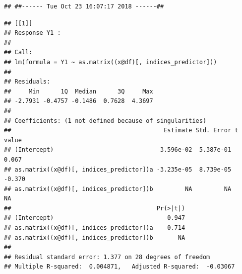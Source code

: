\documentclass{article}
\begin{document}
\begin{knitrout}
\color{fgcolor}\begin{kframe}
\begin{alltt}
\hlstd{()}
\end{alltt}
\begin{verbatim}
## ##------ Tue Oct 23 16:07:17 2018 ------##
\end{verbatim}
\begin{alltt}
 \hlkwb{<-} \hlstd{(}\hlstd{,}
                                \hlstd{=}\hlstd{,}
                                \hlstd{=}\hlstd{(}\hlstd{,} \hlopt{:}\hlstd{),}
                                \hlstd{=} \hlstd{(}\hlstd{,} \hlstd{,} \hlstd{,} \hlstd{),} 
                                \hlopt{::}\hlstd{(}\hlstd{,} \hlstd{(}\hlstd{,}\hlstd{,}\hlstd{,}\hlstd{)),}
                                \hlstd{=}\hlstd{(}\hlstd{=}\hlstd{(}\hlopt{:}\hlstd{,} \hlstd{),} \hlstd{=}\hlstd{(}\hlstd{,} \hlstd{)))}
\end{alltt}
\begin{verbatim}
## [[1]]
## Response Y1 :
## 
## Call:
## lm(formula = Y1 ~ as.matrix((x@df)[, indices_predictor]))
## 
## Residuals:
##     Min      1Q  Median      3Q     Max 
## -2.7931 -0.4757 -0.1486  0.7628  4.3697 
## 
## Coefficients: (1 not defined because of singularities)
##                                           Estimate Std. Error t value
## (Intercept)                              3.596e-02  5.387e-01   0.067
## as.matrix((x@df)[, indices_predictor])a -3.235e-05  8.739e-05  -0.370
## as.matrix((x@df)[, indices_predictor])b         NA         NA      NA
##                                         Pr(>|t|)
## (Intercept)                                0.947
## as.matrix((x@df)[, indices_predictor])a    0.714
## as.matrix((x@df)[, indices_predictor])b       NA
## 
## Residual standard error: 1.377 on 28 degrees of freedom
## Multiple R-squared:  0.004871,	Adjusted R-squared:  -0.03067 

\end{verbatim}
\end{kframe}
\end{knitrout}
\end{document}
